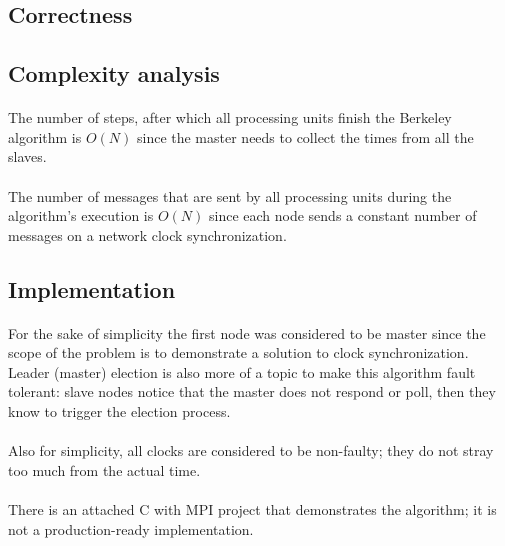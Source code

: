 \documentclass[12pt]{article}
\begin{document}
\subsection{Correctness}

\subsection{Complexity analysis}
\paragraph{}
The number of steps, after which all processing units finish the Berkeley algorithm is $O(N)$ since the master needs to collect the times from all the slaves.

\paragraph{}
The number of messages that are sent by all processing units during the algorithm's execution is $O(N)$ since each node sends a constant number of messages on a network clock synchronization.


\subsection{Implementation}
\paragraph{}
For the sake of simplicity the first node was considered to be master since the scope of the problem is to demonstrate a solution to clock synchronization. Leader (master) election is also more of a topic to make this algorithm fault tolerant: slave nodes notice that the master does not respond or poll, then they know to trigger the election process.

\paragraph{}
Also for simplicity, all clocks are considered to be non-faulty; they do not stray too much from the actual time.

\paragraph{}
There is an attached C with MPI project that demonstrates the algorithm; it is not a production-ready implementation.
\end{document}
